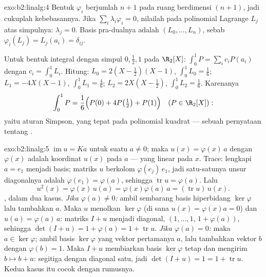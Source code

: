 \begin{solution}{exo:b2:linalg:4}
Bentuk $\varphi_i$ berjumlah $n + 1$ pada ruang berdimensi $(n+1)$, jadi
cukuplah kebebasannya. Jika $\sum_i \lambda_i \varphi_i = 0$, nilailah
pada polinomial Lagrange $L_j$ atas simpulnya: $\lambda_j = 0$. Basis
pra-dualnya adalah $(L_0, \dots, L_n)$, sebab $\varphi_i(L_j) =
L_j(a_i) = \delta_{ij}$.

Untuk bentuk integral dengan simpul $0, \frac12, 1$ pada $\R_2[X]$:
$\int_0^1 P = \sum_i c_i P(a_i)$ dengan $c_i = \int_0^1 L_i$. Hitung:
$L_0 = 2(X - \tfrac12)(X - 1)$, $\int_0^1 L_0 = \frac16$; $L_1 =
-4X(X-1)$, $\int_0^1 L_1 = \frac46$; $L_2 = 2X(X - \tfrac12)$,
$\int_0^1 L_2 = \frac16$. Karenanya
\[
\int_0^1 P = \frac{1}{6}\Bigl(P(0) + 4P\bigl(\tfrac12\bigr) +
P(1)\Bigr)
\quad (P \in \R_2[X]) :
\]
yaitu aturan Simpson, yang tepat pada polinomial kuadrat --- sebuah
pernyataan tentang .
\end{solution}

\begin{solution}{exo:b2:linalg:5}
$\operatorname{im} u = Ka$ untuk suatu $a \neq 0$; maka $u(x) =
\varphi(x)\,a$ dengan $\varphi(x)$ adalah koordinat $u(x)$ pada $a$
--- yang linear pada $x$. Trace: lengkapi $a = e_1$ menjadi basis; matriks
$u$ berkolom $\varphi(e_j)\,e_1$, jadi satu-satunya unsur diagonalnya
adalah $\varphi(e_1) = \varphi(a)$, sehingga $\operatorname{tr} u =
\varphi(a)$. Lalu
\[
u^2(x) = \varphi(x)\, u(a) = \varphi(x)\varphi(a)\, a
= (\operatorname{tr} u)\, u(x).
\]
, dalam dua kasus. \emph{Jika $\varphi(a) \neq 0$:} ambil
sembarang basis hiperbidang $\ker\varphi$ lalu tambahkan $a$. Maka $u$
menolkan $\ker\varphi$ (di sana $u(x) = \varphi(x)a = 0$) dan $u(a) =
\varphi(a)\,a$: matriks $I + u$ menjadi diagonal, $(1, \dots, 1,\,
1 + \varphi(a))$, sehingga $\det(I + u) = 1 + \varphi(a) = 1 +
\operatorname{tr} u$. \emph{Jika $\varphi(a) = 0$:} maka $a \in
\ker\varphi$; ambil basis $\ker\varphi$ yang vektor pertamanya
$a$, lalu tambahkan vektor $b$ dengan $\varphi(b) = 1$. Maka $I + u$
membiarkan basis $\ker\varphi$ tetap dan mengirim $b \mapsto b + a$:
segitiga dengan diagonal satu, jadi $\det(I + u) = 1 = 1 +
\operatorname{tr} u$. Kedua kasus itu cocok dengan rumusnya.
\end{solution}

